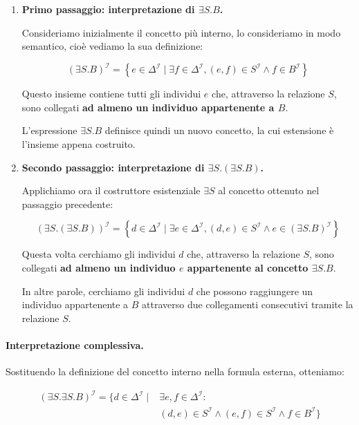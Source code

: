 \begin{enumerate}
    \item \textbf{Primo passaggio: interpretazione di $\exists S.B$.}

    Consideriamo inizialmente il concetto più interno, lo consideriamo in modo semantico, cioè vediamo la sua definizione:

    \[
    (\exists S.B)^{\mathcal I}
    =
    \left\{
    e\in\Delta^{\mathcal I}
    \mid
    \exists f\in\Delta^{\mathcal I},
    (e,f)\in S^{\mathcal I}
    \land f\in B^{\mathcal I}
    \right\}
    \]

    Questo insieme contiene tutti gli individui $e$ che,
    attraverso la relazione $S$, sono collegati
    \textbf{ad almeno un individuo appartenente a $B$}.

    L'espressione $\exists S.B$ definisce quindi un nuovo
    concetto, la cui estensione è l'insieme appena costruito.

    \item \textbf{Secondo passaggio: interpretazione di
    $\exists S.(\exists S.B)$.}

    Applichiamo ora il costruttore esistenziale $\exists S$
    al concetto ottenuto nel passaggio precedente:

    \[
    (\exists S.(\exists S.B))^{\mathcal I}
    =
    \left\{
    d\in\Delta^{\mathcal I}
    \mid
    \exists e\in\Delta^{\mathcal I},
    (d,e)\in S^{\mathcal I}
    \land
    e\in(\exists S.B)^{\mathcal I}
    \right\}
    \]

    Questa volta cerchiamo gli individui $d$ che,
    attraverso la relazione $S$, sono collegati
    \textbf{ad almeno un individuo $e$ appartenente
    al concetto $\exists S.B$}.

    In altre parole, cerchiamo gli individui $d$
    che possono raggiungere un individuo appartenente
    a $B$ attraverso due collegamenti consecutivi
    tramite la relazione $S$.
\end{enumerate}

\paragraph{Interpretazione complessiva.}

Sostituendo la definizione del concetto interno
nella formula esterna, otteniamo:

\[
\boxed{
\begin{aligned}
(\exists S.\exists S.B)^{\mathcal I}
=
\bigl\{
d\in\Delta^{\mathcal I}
\mid {}&
\exists e,f\in\Delta^{\mathcal I}:\\
& (d,e)\in S^{\mathcal I}
\land (e,f)\in S^{\mathcal I}
\land f\in B^{\mathcal I}
\bigr\}
\end{aligned}
}
\]

